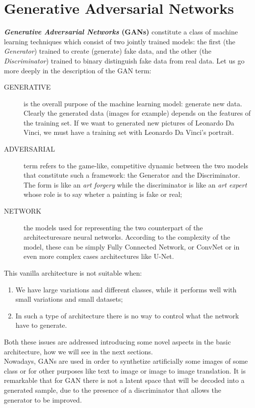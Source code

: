 \section{Generative Adversarial Networks}
\textbf{\textit{Generative Adversarial Networks} (GANs)} constitute a class of machine learning techniques which consist of two jointly trained models: the first (the \textit{Generator}) trained to create (generate) fake data, and the other (the \textit{Discriminator}) trained to binary distinguish fake data from real data. Let us go more deeply in the description of the GAN term:
\begin{description}
    \item[GENERATIVE] is the overall purpose of the machine learning model: generate new data. Clearly the generated data (images for example) depends on the features of the training set. If we want to generated new pictures of Leonardo Da Vinci, we must have a training set with Leonardo Da Vinci's portrait.
    \item[ADVERSARIAL] term refers to the game-like, competitive dynamic between the two models that constitute such a framework: the Generator and the Discriminator. The form is like an \textit{art forgery} while the discriminator is like an \textit{art expert} whose role is to say wheter a painting is fake or real; 
    \item[NETWORK] the models used for representing the two counterpart of the architecturesare neural networks. According to the complexity of the model, these can be simply Fully Connected Network, or ConvNet or in even more complex cases architectures like U-Net.   
\end{description}

This vanilla architecture is not suitable when: 
\begin{enumerate}
    \item We have large variations and different classes, while it performs well with small variations and small datasets;
    \item In such a type of architecture there is no way to control what the network have to generate.
\end{enumerate}
Both these issues are addressed introducing some novel aspects in the basic architecture, how we will see in the next sections.\\
Nowadays, GANs are used in order to synthetize artificially some images of some class or for other purposes like text to image or image to image translation. It is remarkable that for GAN there is not a latent space that will be decoded into a generated sample, due to the presence of a discriminator that allows the generator to be improved.

